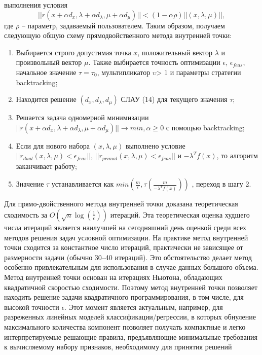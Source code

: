 \documentclass[12pt,a4paper]{article}
\begin{document}
	выполнения условия
	\begin{equation}
		||r(x+\alpha d_{x}, \lambda+\alpha d_{\lambda}, \mu+\alpha d_{\mu})|| < (1-\alpha  \rho)||(x,\lambda,\mu)||,
	\end{equation}		
	где $\rho$ – параметр, задаваемый пользователем. Таким образом, получаем следующую общую схему прямодвойственного метода внутренней точки:
	\begin{enumerate}
		\item Выбирается строго допустимая точка $x$, положительный вектор $\lambda$ и произвольный вектор $\mu$. Также выбирается точность оптимизации $\epsilon$, $\epsilon_{feas}$, начальное значение $\tau=\tau_0$, мультипликатор $\upsilon$> 1 и параметры
		стратегии backtracking;
		\item Находится решение $(d_x, d_\lambda, d_\mu)$ СЛАУ (14) для текущего значения $\tau$;
		\item Решается задача одномерной минимизации $	||r(x + \alpha d_x, \lambda +\alpha d_\lambda, \mu + \alpha d_\mu)|| \longrightarrow min, \alpha \geq 0$	с помощью backtracking;
		\item  Если для нового набора $(x, \lambda, \mu)$ выполнено условие $||r_{dual} (x, \lambda, \mu) < \epsilon_{feas}||$, $||r_{primal} (x, \lambda, \mu) < \epsilon_{feas}||$ и $-\lambda^Tf(x)$, то алгоритм заканчивает работу;
		\item Значение $\tau$ устанавливается как $min(\frac{m}{\epsilon}, \tau(\frac{m}{-\lambda^{T}f(x)}))$
		, переход в шагу 2.
	\end{enumerate}
Для прямо-двойственного метода внутренней точки доказана теоретическая сходимость за \textbf{$O(\sqrt{n}\log(\frac{1}{\epsilon}))$}
итераций. Эта теоретическая оценка худшего числа итераций является наилучшей на сегодняшний день оценкой
среди всех методов решения задач условной оптимизации. На практике метод внутренней точки сходится за
константное число итераций, практически не зависящее от размерности задачи (обычно 30–40 итераций). Это
обстоятельство делает метод особенно привлекательным для использования в случае данных большого объема.
Метод внутренней точки основан на итерациях Ньютона, обладающих квадратичной скоростью сходимости.
Поэтому метод внутренней точки позволяет находить решение задачи квадратичного программирования, в том числе, для высокой точности $\epsilon$.
Этот момент является актуальным, например, для разреженных линейных моделей классификации/регрессии,
в которых обнуление максимального количества компонент позволяет получать компактные и легко интерпретируемые решающие правила, предъявляющие минимальные требования к вычисляемому набору признаков,
необходимому для принятия решений
\end{document}
